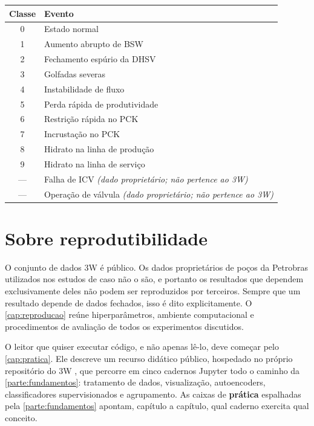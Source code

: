 \begin{center}
\small
\begin{tabular}{cl}
\toprule
\textbf{Classe} & \textbf{Evento} \\
\midrule
0 & Estado normal \\
1 & Aumento abrupto de BSW \\
2 & Fechamento espúrio da DHSV \\
3 & Golfadas severas \\
4 & Instabilidade de fluxo \\
5 & Perda rápida de produtividade \\
6 & Restrição rápida no PCK \\
7 & Incrustação no PCK \\
8 & Hidrato na linha de produção \\
9 & Hidrato na linha de serviço \\
\midrule
--- & Falha de ICV \emph{(dado proprietário; não pertence ao 3W)} \\
--- & Operação de válvula \emph{(dado proprietário; não pertence ao 3W)} \\
\bottomrule
\end{tabular}
\end{center}

\section*{Sobre reprodutibilidade}

O conjunto de dados 3W é público. Os dados proprietários de poços da Petrobras
utilizados nos estudos de caso não o são, e portanto os resultados que dependem
exclusivamente deles não podem ser reproduzidos por terceiros. Sempre que um resultado
depende de dados fechados, isso é dito explicitamente. O \cref{cap:reproducao} reúne
hiperparâmetros, ambiente computacional e procedimentos de avaliação de todos os
experimentos discutidos.

O leitor que quiser executar código, e não apenas lê-lo, deve começar pelo
\cref{cap:pratica}. Ele descreve um recurso didático público, hospedado no próprio
repositório do 3W \citep{Petrobras3W,Lopes2026Intro3W}, que percorre em cinco cadernos
Jupyter todo o caminho da \cref{parte:fundamentos}: tratamento de dados, visualização,
autoencoders, classificadores supervisionados e agrupamento. As caixas de
\textbf{prática} espalhadas pela \cref{parte:fundamentos} apontam, capítulo a capítulo,
qual caderno exercita qual conceito.
